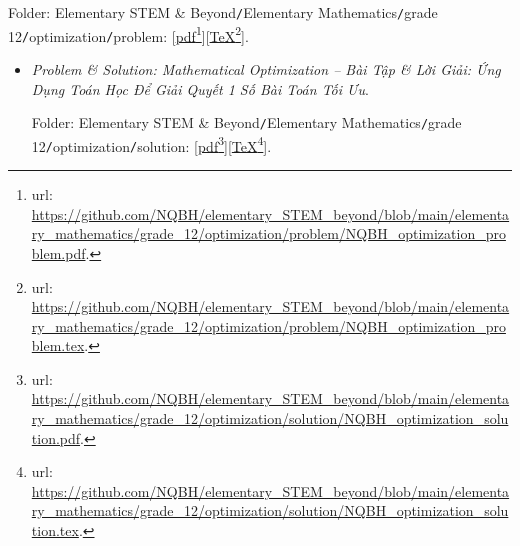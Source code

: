 \documentclass{article}
\begin{document}
\begin{itemize}
	Folder: {\sf Elementary STEM \& Beyond{\tt/}Elementary Mathematics{\tt/}grade 12{\tt/}optimization{\tt/}problem}: [\href{https://github.com/NQBH/elementary_STEM_beyond/blob/main/elementary_mathematics/grade_12/optimization/problem/NQBH_optimization_problem.pdf}{pdf}\footnote{{\sc url}: \url{https://github.com/NQBH/elementary_STEM_beyond/blob/main/elementary_mathematics/grade_12/optimization/problem/NQBH_optimization_problem.pdf}.}][\href{https://github.com/NQBH/elementary_STEM_beyond/blob/main/elementary_mathematics/grade_12/optimization/problem/NQBH_optimization_problem.tex}{\TeX}\footnote{{\sc url}: \url{https://github.com/NQBH/elementary_STEM_beyond/blob/main/elementary_mathematics/grade_12/optimization/problem/NQBH_optimization_problem.tex}.}].
	\begin{itemize}
		\item {\it Problem \& Solution: Mathematical Optimization -- Bài Tập \& Lời Giải: Ứng Dụng Toán Học Để Giải Quyết 1 Số Bài Toán Tối Ưu}.
		
		Folder: {\sf Elementary STEM \& Beyond{\tt/}Elementary Mathematics{\tt/}grade 12{\tt/}optimization{\tt/}solution}: [\href{https://github.com/NQBH/elementary_STEM_beyond/blob/main/elementary_mathematics/grade_12/optimization/solution/NQBH_optimization_solution.pdf}{pdf}\footnote{{\sc url}: \url{https://github.com/NQBH/elementary_STEM_beyond/blob/main/elementary_mathematics/grade_12/optimization/solution/NQBH_optimization_solution.pdf}.}][\href{https://github.com/NQBH/elementary_STEM_beyond/blob/main/elementary_mathematics/grade_12/optimization/solution/NQBH_optimization_solution.tex}{\TeX}\footnote{{\sc url}: \url{https://github.com/NQBH/elementary_STEM_beyond/blob/main/elementary_mathematics/grade_12/optimization/solution/NQBH_optimization_solution.tex}.}].
	\end{itemize}
\end{itemize}
\end{document}
